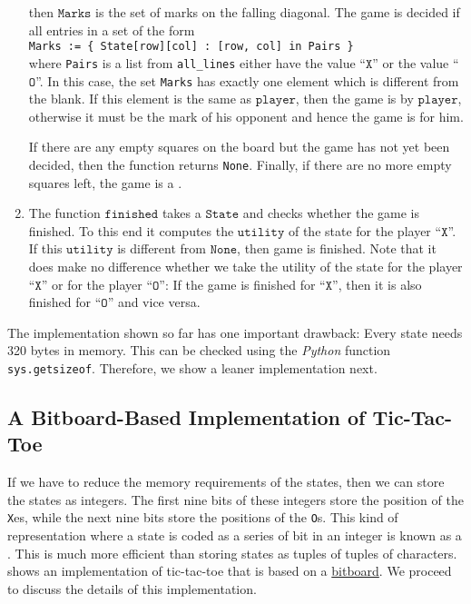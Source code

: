 \begin{enumerate}
      then $\texttt{Marks}$ is the set of marks on the falling diagonal.
      The game is decided if all entries in a set of the form 
      \\[0.2cm]
      \hspace*{1.3cm}
      \texttt{Marks := \{ State[row][col] : [row, col] in Pairs \}}
      \\[0.2cm]
      where \texttt{Pairs} is a list from \texttt{all\_lines} either have the value
      ``$\texttt{X}$'' or the value ``$\texttt{O}$''.  In this case, the set \texttt{Marks} has exactly one
      element which is different from the blank.  If this element is the same as $\texttt{player}$, then the
      game is  by $\texttt{player}$, otherwise it must be the mark of his opponent and hence the game
      is  for him. 

      If there are any empty squares on the board but the game has not yet been decided,
      then the function returns \texttt{None}.  Finally, if there are no more empty squares left, the game is a
      . 
\item The function $\texttt{finished}$ takes a $\texttt{State}$ and checks whether the game is finished.
      To this end it computes the $\texttt{utility}$ of the state for the player ``$\texttt{X}$''.  
      If this $\texttt{utility}$ is different from $\mathtt{None}$, then game is finished.  Note that it does make no
      difference whether we take the utility of the state for the player ``$\texttt{X}$'' or for the player
      ``$\texttt{O}$'': If the game is finished for  ``$\texttt{X}$'', then it is also finished for ``$\texttt{O}$'' and vice versa.
\end{enumerate}
The implementation shown so far has one important drawback: Every state needs 320 bytes in memory.
This can be checked using the \textsl{Python} function \texttt{sys.getsizeof}.
Therefore, we show a leaner implementation next.

\subsection{A Bitboard-Based Implementation of Tic-Tac-Toe}
If we have to reduce the memory requirements of the states, then we can store the states as integers.  The
first nine bits of these integers store the position of the \texttt{X}es, while the next nine bits store the
positions of the \texttt{O}s.  This kind of representation where a state is coded as a series of bit in an
integer is known as a  .  This is much more efficient than storing states as
tuples of tuples of characters.   shows an implementation of tic-tac-toe that
is based on a \href{https://en.wikipedia.org/wiki/Bitboard}{bitboard}.  We proceed to discuss the details of
this implementation.

